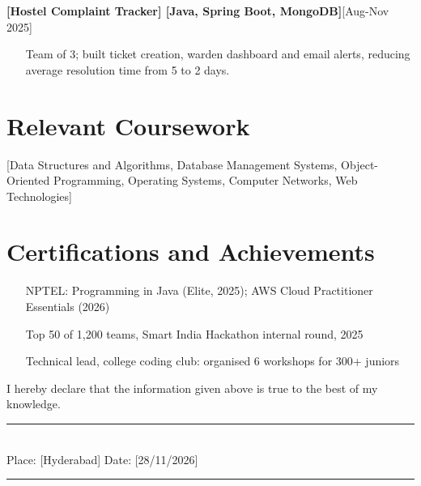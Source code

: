 \documentclass[10pt]{article}
\newcommand{\entry}[2]{\textbf{#1}\hfill #2\par}
\begin{document}
\vspace{4pt}

\entry{\textbf{[Hostel Complaint Tracker]}  \textbar{}  [Java, Spring Boot, MongoDB]}{[Aug-Nov 2025]}

\begin{itemize}
  \item [Team of 3; built ticket creation, warden dashboard and email alerts, reducing average resolution time from 5 to 2 days.]
\end{itemize}

\vspace{4pt}

\section{Relevant Coursework}

[Data Structures and Algorithms, Database Management Systems, Object-Oriented Programming, Operating Systems, Computer Networks, Web Technologies]\par\vspace{4pt}

\section{Certifications and Achievements}

\begin{itemize}
  \item [NPTEL: Programming in Java (Elite, 2025); AWS Cloud Practitioner Essentials (2026)]
  \item [Top 50 of 1,200 teams, Smart India Hackathon internal round, 2025]
  \item [Technical lead, college coding club: organised 6 workshops for 300+ juniors]
\end{itemize}

I hereby declare that the information given above is true to the best of my knowledge.\par\vspace{4pt}

\vspace{32pt}\noindent\parbox[t]{0.3\linewidth}{\centering\rule{\linewidth}{0.5pt}\\ Place: [Hyderabad]   Date: [28/11/2026]}\hfill\parbox[t]{0.3\linewidth}{\centering\rule{\linewidth}{0.5pt}\\ [Ananya Reddy]}\par
\end{document}
